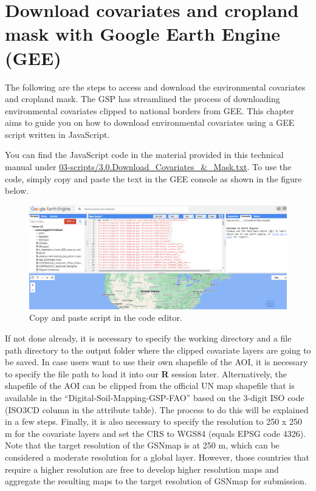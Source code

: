 \documentclass[
  10pt,
  b5paper,
  oneside]{book}
\begin{document}
\hypertarget{download-covariates-and-cropland-mask-with-google-earth-engine-gee}{%
\section{Download covariates and cropland mask with Google Earth Engine (GEE)}\label{download-covariates-and-cropland-mask-with-google-earth-engine-gee}}

The following are the steps to access and download the environmental covariates and cropland mask. The GSP has streamlined the process of downloading environmental covariates clipped to national borders from GEE. This chapter aims to guide you on how to download environmental covariates using a GEE script written in JavaScript.

You can find the JavaScript code in the material provided in this technical manual under \href{https://github.com/FAO-GSP/GSNmap-TM/tree/main/Digital-Soil-Mapping/03-Scripts}{03-scripts/3.0.Download\_Covariates\_\&\_Mask.txt}. To use the code, simply copy and paste the text in the GEE console as shown in the figure below.

\begin{figure}
\includegraphics[width=1\linewidth]{images/javaScript_GEE} \caption{Copy and paste script in the code editor.}\label{fig:screenshot}
\end{figure}

If not done already, it is necessary to specify the working directory and a file path directory to the output folder where the clipped covariate layers are going to be saved. In case users want to use their own shapefile of the AOI, it is necessary to specify the file path to load it into our \textbf{R} session later. Alternatively, the shapefile of the AOI can be clipped from the official UN map shapefile that is available in the ``Digital-Soil-Mapping-GSP-FAO'' based on the 3-digit ISO code (ISO3CD column in the attribute table). The process to do this will be explained in a few steps. Finally, it is also necessary to specify the resolution to 250 x 250 m for the covariate layers and set the CRS to WGS84 (equals EPSG code 4326). Note that the target resolution of the GSNmap is at 250 m, which can be considered a moderate resolution for a global layer. However, those countries that require a higher resolution are free to develop higher resolution maps and aggregate the resulting maps to the target resolution of GSNmap for submission.
\end{document}
